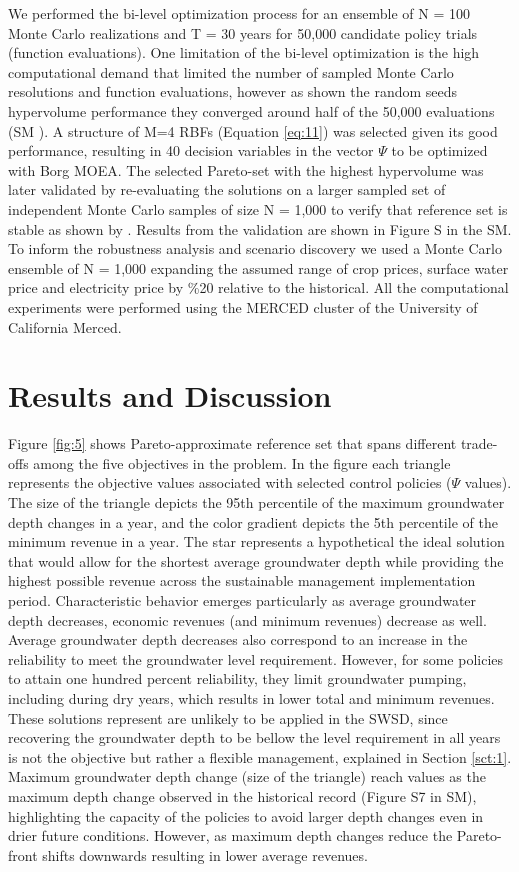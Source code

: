 \documentclass[a4paper,fleqn]{cas-sc}
\begin{document}
We performed the bi-level optimization process for an ensemble of N = 100 Monte Carlo realizations and T = 30 years for 50,000 candidate policy trials (function evaluations). One limitation of the bi-level optimization is the high computational demand that limited the number of sampled Monte Carlo resolutions and function evaluations, however as shown the random seeds hypervolume performance they converged around half of the 50,000 evaluations (SM ). A structure of M=4 RBFs (Equation \ref{eq:11}) was selected given its good performance, resulting in 40 decision variables in the vector $\Psi$ to be optimized with Borg MOEA. The selected Pareto-set with the highest hypervolume was later validated by re-evaluating the solutions on a larger sampled set of independent Monte Carlo samples of size N = 1,000 to verify that reference set is stable as shown by \citep{gupta_can_2020}. Results from the validation are shown in Figure S in the SM. To inform the robustness analysis and scenario discovery we used a Monte Carlo ensemble of N = 1,000 expanding the assumed range of crop prices, surface water price and electricity price by \%20 relative to the historical. All the computational experiments were performed using the MERCED cluster of the University of California Merced. 

\section{Results and Discussion}

Figure \ref{fig:5} shows Pareto-approximate reference set that spans different trade-offs among the five objectives in the problem. In the figure each triangle represents the objective values associated with selected control policies ($\Psi$ values). The size of the triangle depicts the 95th percentile of the maximum groundwater depth changes in a year, and the color gradient depicts the 5th percentile of the minimum revenue in a year. The star represents a hypothetical the ideal solution that would allow for the shortest average groundwater depth while providing the highest possible revenue across the sustainable management implementation period. Characteristic behavior emerges particularly as average groundwater depth decreases, economic revenues (and minimum revenues) decrease as well. Average groundwater depth decreases also correspond to an increase in the reliability to meet the groundwater level requirement. However, for some policies to attain one hundred percent reliability, they limit groundwater pumping, including during dry years, which results in lower total and minimum revenues. These solutions represent are unlikely to be applied in the SWSD, since recovering the groundwater depth to be bellow the level requirement in all years is not the objective but rather a flexible management, explained in Section \ref{sct:1}. Maximum groundwater depth change (size of the triangle) reach values as the maximum depth change observed in the historical record (Figure S7 in SM), highlighting the capacity of the policies to avoid larger depth changes even in drier future conditions. However, as maximum depth changes reduce the Pareto-front shifts downwards resulting in lower average revenues. 
\end{document}

